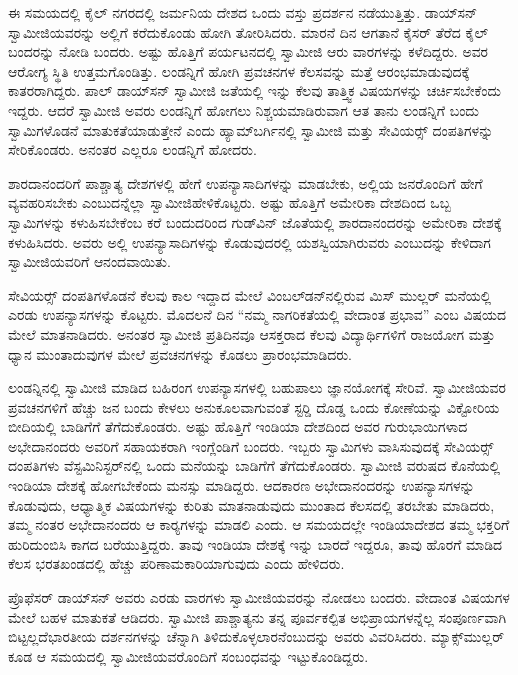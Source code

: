  ಈ ಸಮಯದಲ್ಲಿ ಕೈಲ್ ನಗರದಲ್ಲಿ ಜರ್ಮನಿಯ ದೇಶದ ಒಂದು ವಸ್ತು ಪ್ರದರ್ಶನ ನಡೆಯುತ್ತಿತ್ತು. ಡಾಯ್‍ಸನ್‍ ಸ್ವಾಮೀಜಿಯವರನ್ನು ಅಲ್ಲಿಗೆ ಕರೆದುಕೊಂಡು ಹೋಗಿ ತೋರಿಸಿದರು. ಮಾರನೆ ದಿನ ಆಗತಾನೆ ಕೈಸರ್ ತೆರೆದ ಕೈಲ್ ಬಂದರನ್ನು ನೋಡಿ ಬಂದರು. ಅಷ್ಟು ಹೊತ್ತಿಗೆ ಪರ್ಯಟನದಲ್ಲಿ ಸ್ವಾಮೀಜಿ ಆರು ವಾರಗಳನ್ನು ಕಳೆದಿದ್ದರು. ಅವರ ಆರೋಗ್ಯ ಸ್ಥಿತಿ ಉತ್ತಮಗೊಂಡಿತ್ತು. ಲಂಡನ್ನಿಗೆ ಹೋಗಿ ಪ್ರವಚನಗಳ ಕೆಲಸವನ್ನು ಮತ್ತೆ ಆರಂಭಮಾಡುವುದಕ್ಕೆ ಕಾತರರಾಗಿದ್ದರು. ಪಾಲ್ ಡಾಯ್‍ಸನ್‍ ಸ್ವಾಮೀಜಿ ಜತೆಯಲ್ಲಿ ಇನ್ನು ಕೆಲವು ತಾತ್ತ್ವಿಕ ವಿಷಯಗಳನ್ನು ಚರ್ಚಿಸಬೇಕೆಂದು ಇದ್ದರು. ಆದರೆ ಸ್ವಾಮೀಜಿ ಅವರು ಲಂಡನ್ನಿಗೆ ಹೋಗಲು ನಿಶ್ಚಯಮಾಡಿರುವಾಗ ಆತ ತಾನು ಲಂಡನ್ನಿಗೆ ಬಂದು ಸ್ವಾಮಿಗಳೊಡನೆ ಮಾತುಕತೆಯಾಡುತ್ತೇನೆ ಎಂದು ಹ್ಯಾಮ್‍ಬರ್ಗಿನಲ್ಲಿ ಸ್ವಾಮೀಜಿ ಮತ್ತು ಸೇವಿಯರ್ಸ್‍‍ ದಂಪತಿಗಳನ್ನು ಸೇರಿಕೊಂಡರು. ಅನಂತರ ಎಲ್ಲರೂ ಲಂಡನ್ನಿಗೆ ಹೋದರು. 

 ಶಾರದಾನಂದರಿಗೆ ಪಾಶ್ಚಾತ್ಯ ದೇಶಗಳಲ್ಲಿ ಹೇಗೆ ಉಪನ್ಯಾಸಾದಿಗಳನ್ನು ಮಾಡಬೇಕು, ಅಲ್ಲಿಯ ಜನರೊಂದಿಗೆ ಹೇಗೆ ವ್ಯವಹರಿಸಬೇಕು ಎಂಬುದನ್ನೆಲ್ಲಾ ಸ್ವಾಮೀಜಿ\break ಹೇಳಿಕೊಟ್ಟರು. ಅಷ್ಟು ಹೊತ್ತಿಗೆ ಅಮೇರಿಕಾ ದೇಶದಿಂದ ಒಬ್ಬ ಸ್ವಾಮಿಗಳನ್ನು ಕಳುಹಿಸಬೇಕೆಂಬ ಕರೆ ಬಂದುದರಿಂದ ಗುಡ್‍ವಿನ್ ಜೊತೆಯಲ್ಲಿ ಶಾರದಾನಂದರನ್ನು ಅಮೇರಿಕಾ ದೇಶಕ್ಕೆ ಕಳುಹಿಸಿದರು. ಅವರು ಅಲ್ಲಿ ಉಪನ್ಯಾಸಾದಿಗಳನ್ನು ಕೊಡುವುದರಲ್ಲಿ ಯಶಸ್ವಿಯಾಗಿರುವರು ಎಂಬುದನ್ನು ಕೇಳಿದಾಗ ಸ್ವಾಮೀಜಿಯವರಿಗೆ ಆನಂದವಾಯಿತು. 

 ಸೇವಿಯರ್ಸ್‍‍ ದಂಪತಿಗಳೊಡನೆ ಕೆಲವು ಕಾಲ ಇದ್ದಾದ ಮೇಲೆ ವಿಂಬಲ್‍ಡನ್‍ನಲ್ಲಿರುವ ಮಿಸ್ ಮುಲ್ಲರ್ ಮನೆಯಲ್ಲಿ ಎರಡು ಉಪನ್ಯಾಸಗಳನ್ನು ಕೊಟ್ಟರು. ಮೊದಲನೆ ದಿನ “ನಮ್ಮ ನಾಗರಿಕತೆಯಲ್ಲಿ ವೇದಾಂತ ಪ್ರಭಾವ” ಎಂಬ ವಿಷಯದ ಮೇಲೆ ಮಾತನಾಡಿದರು. ಅನಂತರ ಸ್ವಾಮೀಜಿ ಪ್ರತಿದಿನವೂ ಆಸಕ್ತರಾದ ಕೆಲವು ವಿದ್ಯಾರ್ಥಿಗಳಿಗೆ ರಾಜಯೋಗ ಮತ್ತು ಧ್ಯಾನ ಮುಂತಾದುವುಗಳ ಮೇಲೆ ಪ್ರವಚನಗಳನ್ನು ಕೊಡಲು ಪ್ರಾರಂಭಮಾಡಿದರು. 

 ಲಂಡನ್ನಿನಲ್ಲಿ ಸ್ವಾಮೀಜಿ ಮಾಡಿದ ಬಹಿರಂಗ ಉಪನ್ಯಾಸಗಳಲ್ಲಿ ಬಹುಪಾಲು ಜ್ಞಾನಯೋಗಕ್ಕೆ ಸೇರಿವೆ. ಸ್ವಾಮೀಜಿಯವರ ಪ್ರವಚನಗಳಿಗೆ ಹೆಚ್ಚು ಜನ ಬಂದು ಕೇಳಲು ಅನುಕೂಲವಾಗುವಂತೆ ಸ್ಟರ‍್ಡಿ ದೊಡ್ಡ ಒಂದು ಕೋಣೆಯನ್ನು ವಿಕ್ಟೋರಿಯ ಬೀದಿಯಲ್ಲಿ ಬಾಡಿಗೆಗೆ ತೆಗೆದುಕೊಂಡರು. ಅಷ್ಟು ಹೊತ್ತಿಗೆ ಇಂಡಿಯಾ ದೇಶದಿಂದ ಅವರ ಗುರುಭಾಯಿಗಳಾದ ಅಭೇದಾನಂದರು ಅವರಿಗೆ ಸಹಾಯಕರಾಗಿ ಇಂಗ್ಲೆಂಡಿಗೆ ಬಂದರು. ಇಬ್ಬರು ಸ್ವಾಮಿಗಳು ವಾಸಿಸುವುದಕ್ಕೆ ಸೇವಿಯರ್ಸ್‍‍ ದಂಪತಿಗಳು ವೆಸ್ಟಮಿನಿಸ್ಟರ್‌ನಲ್ಲಿ ಒಂದು ಮನೆಯನ್ನು ಬಾಡಿಗೆಗೆ ತೆಗೆದುಕೊಂಡರು. ಸ್ವಾಮೀಜಿ ವರುಷದ ಕೊನೆಯಲ್ಲಿ ಇಂಡಿಯಾ ದೇಶಕ್ಕೆ ಹೋಗಬೇಕೆಂದು ಮನಸ್ಸು ಮಾಡಿದ್ದರು. ಆದಕಾರಣ ಅಭೇದಾನಂದರನ್ನು ಉಪನ್ಯಾಸಗಳನ್ನು ಕೊಡುವುದು, ಆಧ್ಯಾತ್ಮಿಕ ವಿಷಯಗಳನ್ನು ಕುರಿತು ಮಾತನಾಡುವುದು ಮುಂತಾದ ಕೆಲಸದಲ್ಲಿ ತರಬೇತು ಮಾಡಿದರು, ತಮ್ಮ ನಂತರ ಅಭೇದಾನಂದರು ಆ ಕಾರ‍್ಯಗಳನ್ನು ಮಾಡಲಿ ಎಂದು. ಆ ಸಮಯದಲ್ಲೇ ಇಂಡಿಯಾದೇಶದ ತಮ್ಮ ಭಕ್ತರಿಗೆ ಹುರಿದುಂಬಿಸಿ ಕಾಗದ ಬರೆಯುತ್ತಿದ್ದರು. ತಾವು ಇಂಡಿಯಾ ದೇಶಕ್ಕೆ ಇನ್ನು ಬಾರದೆ ಇದ್ದರೂ, ತಾವು ಹೊರಗೆ ಮಾಡಿದ ಕೆಲಸ ಭರತಖಂಡದಲ್ಲಿ ಹೆಚ್ಚು ಪರಿಣಾಮಕಾರಿಯಾಗುವುದು ಎಂದು ಹೇಳಿದರು. 

 ಪ್ರೊಫೆಸರ್ ಡಾಯ್‍ಸನ್‍ ಅವರು ಎರಡು ವಾರಗಳು ಸ್ವಾಮೀಜಿಯವರನ್ನು ನೋಡಲು ಬಂದರು. ವೇದಾಂತ ವಿಷಯಗಳ ಮೇಲೆ ಬಹಳ ಮಾತುಕತೆ ಆಡಿದರು. ಸ್ವಾಮೀಜಿ ಪಾಶ್ಚಾತ್ಯನು ತನ್ನ ಪೂರ್ವಕಲ್ಪಿತ ಅಭಿಪ್ರಾಯಗಳನ್ನೆಲ್ಲ ಸಂಪೂರ್ಣವಾಗಿ ಬಿಟ್ಟಲ್ಲದೆ\break ಭಾರತೀಯ ದರ್ಶನಗಳನ್ನು ಚೆನ್ನಾಗಿ ತಿಳಿದುಕೊಳ್ಳಲಾರನೆಂಬುದನ್ನು ಅವರು ವಿವರಿಸಿದರು. ಮ್ಯಾಕ್ಸ್‌ಮುಲ್ಲರ್ ಕೂಡ ಆ ಸಮಯದಲ್ಲಿ ಸ್ವಾಮೀಜಿಯವರೊಂದಿಗೆ ಸಂಬಂಧವನ್ನು ಇಟ್ಟುಕೊಂಡಿದ್ದರು. 

